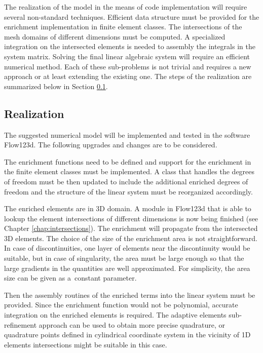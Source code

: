 \documentclass[bibliography=totocnumbered,dvipsnames,FM,Dis]{tulthesis}
\begin{document}
The realization of the model in the means of code implementation will require several non-standard techniques.
Efficient data structure must be provided for the enrichment implementation in finite element classes.
The intersections of the mesh domains of different dimensions must be computed. A specialized integration
on the intersected elements is needed to assembly the integrals in the system matrix. 
Solving the final linear algebraic system will require an efficient numerical method.
Each of these sub-problems is not trivial and requires a new approach or at least extending the existing one.
The steps of the realization are summarized below in Section \ref{sec:realization}.

\subsection{Realization} \label{sec:realization}
The suggested numerical model will be implemented and tested in the software Flow123d.
The following upgrades and changes are to be considered.

The enrichment functions need to be defined and support for the enrichment in the finite element classes must be implemented. 
A class that handles the degrees of freedom must be then updated to include the additional enriched degrees of freedom
and the structure of the linear system must be reorganized accordingly.

The enriched elements are in 3D domain. A module in Flow123d that is able to lookup the element intersections
of different dimensions is now being finished (see Chapter \ref{chap:intersections}). The enrichment will propagate from the intersected 3D elements.
The choice of the size of the enrichment area is not straightforward. In case of discontinuities, one layer of elements
near the discontinuity would be suitable, but in case of singularity, the area must be large enough so that 
the large gradients in the quantities are well approximated. For simplicity, the area size can be given as
a~constant parameter.

Then the assembly routines of the enriched terms into the linear system must be provided.
Since the enrichment function would not be polynomial, accurate integration on the enriched elements is required. 
The adaptive elements sub-refinement approach can be used to obtain more precise quadrature, 
or quadrature points defined in cylindrical coordinate system in the vicinity of 1D elements intersections
might be suitable in this case.
\end{document}
